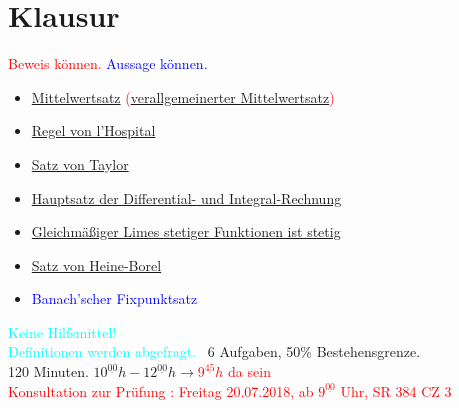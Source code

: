 \section*{Klausur}
\textcolor{red}{Beweis können.}
\textcolor{blue}{Aussage können.}
\begin{itemize}
	\item \textcolor{red}{\hyperref[vl_07_MWS]{Mittelwertsatz} (\hyperref[satz_9]{verallgemeinerter Mittelwertsatz})}
	\item \textcolor{blue}{\hyperref[regel_von_hospital]{Regel von l'Hospital}}
	\item \textcolor{red}{\hyperref[satz_von_taylor]{Satz von Taylor}}
	\item \textcolor{red}{\hyperref[vl_12_satz_01]{Hauptsatz der Differential- und Integral-Rechnung}}
	\item \textcolor{red}{\hyperref[vl_17_satz_2]{Gleichmäßiger Limes stetiger Funktionen ist stetig}}
	\item \textcolor{blue}{\hyperref[satz_v_heine_borel]{Satz von Heine-Borel}}
	\item \textcolor{blue}{Banach'scher Fixpunktsatz}
\end{itemize}
\textcolor{cyan}{Keine Hilfsmittel!}\\
\textcolor{cyan}{Definitionen werden abgefragt.}
~6 Aufgaben, 50\% Bestehensgrenze.\\
120 Minuten. $10^{\underline{00}}h - 12^{\underline{00}}h \rightarrow$\textcolor{red}{$9^{\underline{45}}h$ da sein}\\

\textcolor{red}{Konsultation zur Prüfung : Freitag 20.07.2018, 
ab $9^{\underline{00}}$ Uhr, SR 384 CZ 3}